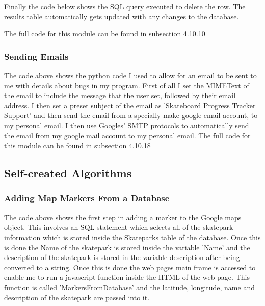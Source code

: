 \begin{landscape}
Finally the code below shows the SQL query executed to delete the row. The results table automatically gets updated with any changes to the database.


The full code for this module can be found in subsection  4.10.10




\subsubsection{Sending Emails}


The code above shows the python code I used to allow for an email to be sent to me with details about bugs in my program. First of all I set the MIMEText of the email to include the message that the user set, followed by their email address. I then set a preset subject of the email as 'Skateboard Progress Tracker Support' and then send the email from a specially make google email account, to my personal email. I then use Googles' SMTP protocols to automatically send the email from my google mail account to my personal email. The full code for this module can be found in subsection 4.10.18


\subsection{Self-created Algorithms}

\subsubsection{Adding Map Markers From a Database}


The code above shows the first step in adding a marker to the Google maps object. This involves an SQL statement which selects all of the skatepark information which is stored inside the Skateparks table of the database. Once this is done the Name of the skatepark is stored inside the variable 'Name' and the description of the skatepark is stored in the variable description after being converted to a string. Once this is done the web pages main frame is accessed to enable me to run a javascript function inside the HTML of the web page. This function is called 'MarkersFromDatabase' and the latitude, longitude, name and description of the skatepark are passed into it.



\end{landscape}

